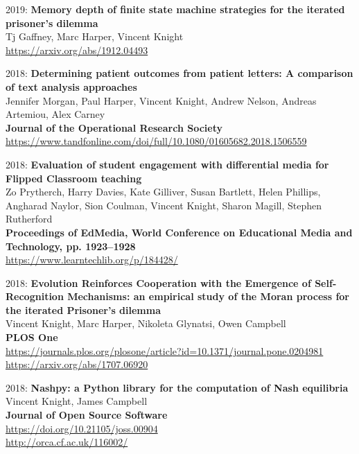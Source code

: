 \documentclass[10pt]{article}
\begin{document}
\begin{etaremune}
\item
  2019: \textbf{Memory depth of finite state machine strategies for the iterated prisoner's dilemma}\\
  Tj Gaffney, Marc Harper, Vincent Knight\\
  
  
  \url{https://arxiv.org/abs/1912.04493}\\

\item
  2018: \textbf{Determining patient outcomes from patient letters: A comparison of text analysis approaches}\\
  Jennifer Morgan, Paul Harper, Vincent Knight, Andrew Nelson, Andreas Artemiou, Alex Carney\\
  \textbf{Journal of the Operational Research Society}\\
  \url{https://www.tandfonline.com/doi/full/10.1080/01605682.2018.1506559}\\
  

\item
  2018: \textbf{Evaluation of student engagement with differential media for Flipped Classroom teaching}\\
  Zo Prytherch, Harry Davies, Kate Gilliver, Susan Bartlett, Helen Phillips, Angharad Naylor, Sion Coulman, Vincent Knight, Sharon Magill, Stephen Rutherford\\
  \textbf{Proceedings of EdMedia, World Conference on Educational Media and Technology, pp. 1923--1928}\\
  \url{https://www.learntechlib.org/p/184428/}\\
  

\item
  2018: \textbf{Evolution Reinforces Cooperation with the Emergence of Self-Recognition Mechanisms: an empirical study of the Moran process for the iterated Prisoner's dilemma }\\
  Vincent Knight, Marc Harper, Nikoleta Glynatsi, Owen Campbell\\
  \textbf{PLOS One}\\
  \url{https://journals.plos.org/plosone/article?id=10.1371/journal.pone.0204981}\\
  \url{https://arxiv.org/abs/1707.06920}\\

\item
  2018: \textbf{Nashpy: a Python library for the computation of Nash equilibria}\\
  Vincent Knight, James Campbell\\
  \textbf{Journal of Open Source Software}\\
  \url{https://doi.org/10.21105/joss.00904}\\
  \url{http://orca.cf.ac.uk/116002/}\\


\end{etaremune}
\end{document}
